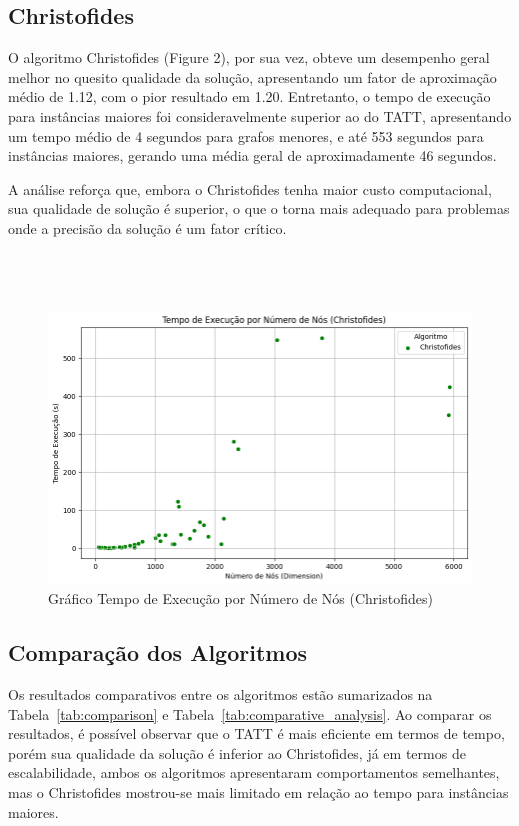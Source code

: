 \documentclass[12pt]{article}
\begin{document}
\subsection{Christofides}
O algoritmo Christofides (Figure 2), por sua vez, obteve um desempenho geral melhor no quesito qualidade da solução, apresentando um fator de aproximação médio de 1.12, com o pior resultado em 1.20. Entretanto, o tempo de execução para instâncias maiores foi consideravelmente superior ao do TATT, apresentando um tempo médio de 4 segundos para grafos menores, e até 553 segundos para instâncias maiores, gerando uma média geral de aproximadamente 46 segundos.

A análise reforça que, embora o Christofides tenha maior custo computacional, sua qualidade de solução é superior, o que o torna mais adequado para problemas onde a precisão da solução é um fator crítico.
\\
\\
\\
\\

\begin{figure}[ht]
\centering
\includegraphics[width=.7\textwidth]{Figure2.png}
\caption{Gráfico Tempo de Execução por Número de Nós (Christofides)}
\label{fig:exampleFig2}
\end{figure}

\subsection{Comparação dos Algoritmos}
Os resultados comparativos entre os algoritmos estão sumarizados na Tabela~\ref{tab:comparison} e Tabela~\ref{tab:comparative_analysis}. Ao comparar os resultados, é possível observar que o TATT é mais eficiente em termos de tempo, porém sua qualidade da solução é inferior ao Christofides, já em termos de escalabilidade, ambos os algoritmos apresentaram comportamentos semelhantes, mas o Christofides mostrou-se mais limitado em relação ao tempo para instâncias maiores.
\end{document}
